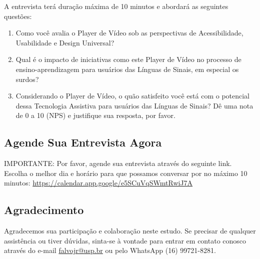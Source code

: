 A entrevista terá duração máxima de 10 minutos e abordará as seguintes questões:

\begin{enumerate}
    \item Como você avalia o Player de Vídeo sob as perspectivas de Acessibilidade, Usabilidade e Design Universal?
    \item Qual é o impacto de iniciativas como este Player de Vídeo no processo de ensino-aprendizagem para usuários das Línguas de Sinais, em especial os surdos?
    \item Considerando o Player de Vídeo, o quão satisfeito você está com o potencial dessa Tecnologia Assistiva para usuários das Línguas de Sinais? Dê uma nota de 0 a 10 (NPS) e justifique sua resposta, por favor.
\end{enumerate}

\subsection{Agende Sua Entrevista Agora}

IMPORTANTE: Por favor, agende sua entrevista através do seguinte link. Escolha o melhor 
dia e horário para que possamos conversar por no máximo 10 minutos: 
\url{https://calendar.app.google/e5SCuVqSWmtRwiJ7A}

\subsection{Agradecimento}

Agradecemos sua participação e colaboração neste estudo. Se precisar de qualquer 
assistência ou tiver dúvidas, sinta-se à vontade para entrar em contato conosco através do e-mail \href{mailto:falvojr@usp.br}{falvojr@usp.br} ou pelo WhatsApp (16) 99721-8281. 